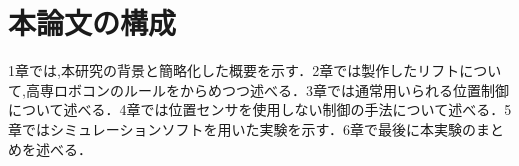 \section{本論文の構成}
1章では,本研究の背景と簡略化した概要を示す．2章では製作したリフトについて,高専ロボコンのルールをからめつつ述べる．3章では通常用いられる位置制御について述べる．4章では位置センサを使用しない制御の手法について述べる．5章ではシミュレーションソフトを用いた実験を示す．6章で最後に本実験のまとめを述べる．